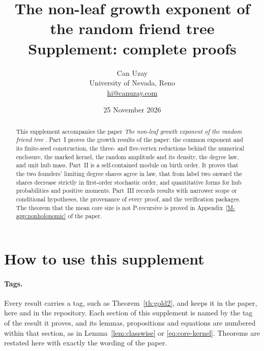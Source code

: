 \documentclass[11pt]{article}
\title{The non-leaf growth exponent of the random friend tree\\[4pt]\large Supplement: complete proofs}
\author{Can Uzay\\\small University of Nevada, Reno\\\small\href{mailto:hi@canuzay.com}{hi@canuzay.com}}
\date{25 November 2026}
\theoremstyle{remark}
\numberwithin{equation}{section}
\begin{document}
\maketitle
\begin{abstract}
This supplement accompanies the paper \emph{The non-leaf growth exponent of the random friend tree} \cite{Main}. Part~I proves the growth results of the paper: the common exponent and its finite-seed construction, the three- and five-vertex reductions behind the numerical enclosure, the marked kernel, the random amplitude and its density, the degree law, and unit hub mass. Part~II is a self-contained module on birth order. It proves that the two founders' limiting degree shares agree in law, that from label two onward the shares decrease strictly in first-order stochastic order, and quantitative forms for hub probabilities and positive moments. Part~III records results with narrower scope or conditional hypotheses, the provenance of every proof, and the verification packages. The theorem that the mean core size is not P-recursive is proved in Appendix~\ref{M-app:nonholonomic} of the paper.
\end{abstract}

\section*{How to use this supplement}
\paragraph{Tags.} Every result carries a tag, such as Theorem~\ref{th:gold2}, and keeps it in the paper, here and in the repository. Each section of this supplement is named by the tag of the result it proves, and its lemmas, propositions and equations are numbered within that section, as in Lemma~\ref{lem:classwise} or \eqref{eq:core-kernel}. Theorems are restated here with exactly the wording of the paper.
\end{document}
